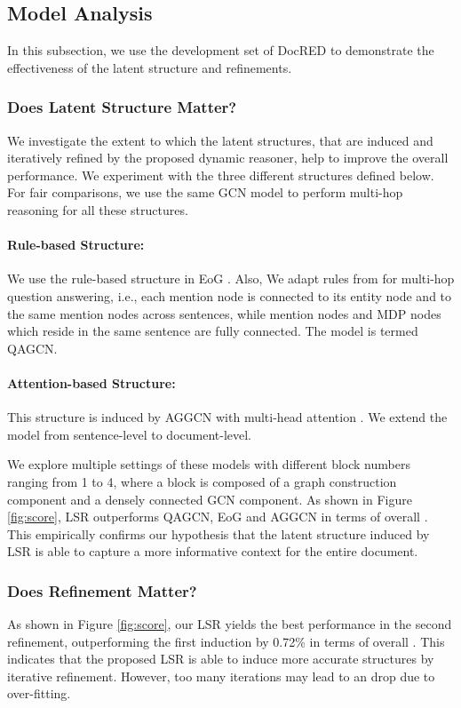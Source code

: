 \documentclass[11pt,a4paper]{article}
\begin{document}
\subsection{Model Analysis}
\label{ssec:4.4}
In this subsection, we use the development set of DocRED to demonstrate the effectiveness of the latent structure and refinements.  
\subsubsection{Does Latent Structure Matter?}
We investigate the extent to which the latent structures, that are induced and iteratively refined by the proposed dynamic reasoner, help to improve the overall performance. We experiment with the three different structures defined below. For fair comparisons, we use the same GCN model to perform multi-hop reasoning for all these structures.

\paragraph{Rule-based Structure:} We use the rule-based structure in EoG \cite{christopoulou2019connecting}. Also, We adapt rules from \citet{de2018question} for multi-hop question answering, i.e., each mention node is connected to its entity node and to the same mention nodes across sentences, while mention nodes and MDP nodes which reside in the same sentence are fully connected. The model is termed QAGCN. 

\paragraph{Attention-based Structure:} This structure is induced by AGGCN \cite{Guo2019AttentionGG} with multi-head attention \citep{Vaswani2017AttentionIA}. We extend the model from sentence-level to document-level.

We explore multiple settings of these models with different block numbers ranging from 1 to 4, where a block is composed of a graph construction component and a densely connected GCN component. As shown in Figure \ref{fig:score}, LSR outperforms QAGCN, EoG and AGGCN in terms of overall . This empirically confirms our hypothesis that the latent structure induced by LSR is able to capture a more informative context for the entire document.



\subsubsection{Does Refinement Matter?}
As shown in Figure \ref{fig:score}, our LSR yields the best performance in the second refinement, outperforming the first induction by 0.72\% in terms of overall . This indicates that the proposed LSR is able to induce more accurate structures by iterative refinement. However, too many iterations may lead to an  drop due to over-fitting. 
\end{document}
